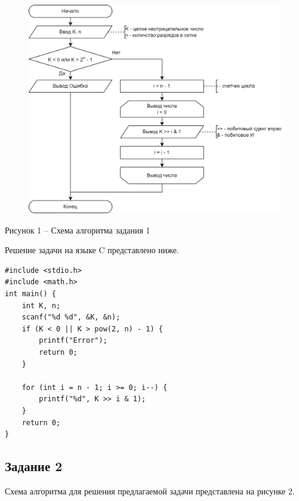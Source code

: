 \documentclass[a4paper,14pt]{extarticle}
\begin{document}
	\begin{figure}[h]
		\centering
		\includegraphics[width=0.8\linewidth]{schemes/s-1}
	\end{figure}
	\begin{center}
		Рисунок 1 – Схема алгоритма задания 1
	\end{center}
	
	Решение задачи на языке C представлено ниже.
	
	\begin{lstlisting}[tabsize=2,basicstyle=\ttfamily]
#include <stdio.h>
#include <math.h>
int main() {
	int K, n;
	scanf("%d %d", &K, &n);
	if (K < 0 || K > pow(2, n) - 1) {
		printf("Error");
		return 0;
	}
	
	for (int i = n - 1; i >= 0; i--) {
		printf("%d", K >> i & 1);
	}
	return 0;
}
	\end{lstlisting}
	
	\subsection*{Задание 2}
	Схема алгоритма для решения предлагаемой задачи представлена на рисунке 2.
	
\end{document}
